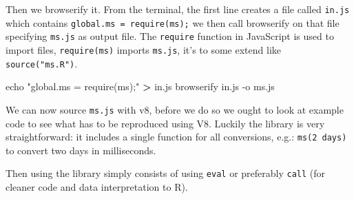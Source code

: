 \documentclass[
]{krantz}
\makeatletter
\newenvironment{Shaded}{\begin{snugshade}}{\end{snugshade}}
\newcommand{\BuiltInTok}[1]{#1}
\newcommand{\CommentTok}[1]{\textcolor[rgb]{0.37,0.37,0.37}{\textit{#1}}}
\newcommand{\ExtensionTok}[1]{#1}
\newcommand{\KeywordTok}[1]{\textcolor[rgb]{0.27,0.27,0.27}{\textbf{#1}}}
\newcommand{\NormalTok}[1]{#1}
\newcommand{\OperatorTok}[1]{\textcolor[rgb]{0.43,0.43,0.43}{\textbf{#1}}}
\newcommand{\StringTok}[1]{\textcolor[rgb]{0.5,0.5,0.5}{#1}}
\newenvironment{kframe}{%
\medskip{}
\setlength{\fboxsep}{.8em}
 \def\at@end@of@kframe{}%
 \ifinner\ifhmode%
  \def\at@end@of@kframe{\end{minipage}}%
  \begin{minipage}{\columnwidth}%
 \fi\fi%
 \def\FrameCommand##1{\hskip\@totalleftmargin \hskip-\fboxsep
 \colorbox{shadecolor}{##1}\hskip-\fboxsep
     \hskip-\linewidth \hskip-\@totalleftmargin \hskip\columnwidth}%
 \MakeFramed {\advance\hsize-\width
   \@totalleftmargin\z@ \linewidth\hsize
   \@setminipage}}%
 {\par\unskip\endMakeFramed%
 \at@end@of@kframe}
\renewenvironment{Shaded}{\begin{kframe}}{\end{kframe}}
\makeatother
\begin{document}
Then we browserify it. From the terminal, the first line creates a file called \texttt{in.js} which contains \texttt{global.ms\ =\ require(\textquotesingle{}ms\textquotesingle{});} we then call browserify on that file specifying \texttt{ms.js} as output file. The \texttt{require} function in JavaScript is used to import files, \texttt{require(\textquotesingle{}ms\textquotesingle{})} imports \texttt{ms.js}, it's to some extend like \texttt{source("ms.R")}.

\begin{Shaded}
\begin{Highlighting}[]
\BuiltInTok{echo} \StringTok{"global.ms = require(\textquotesingle{}ms\textquotesingle{});"} \OperatorTok{>}\NormalTok{ in.js}
\ExtensionTok{browserify}\NormalTok{ in.js {-}o ms.js}
\end{Highlighting}
\end{Shaded}

We can now source \texttt{ms.js} with v8, before we do so we ought to look at example code to see what has to be reproduced using V8. Luckily the library is very straightforward: it includes a single function for all conversions, e.g.: \texttt{ms(\textquotesingle{}2\ days\textquotesingle{})} to convert two days in milliseconds.

\begin{Shaded}
\end{Shaded}

Then using the library simply consists of using \texttt{eval} or preferably \texttt{call} (for cleaner code and data interpretation to R).

\begin{Shaded}
\end{Shaded}
\end{document}
